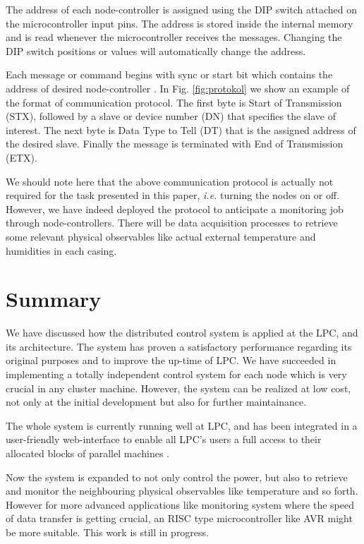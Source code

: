 \documentclass[conference,letterpaper]{IEEEtran}
\begin{document}
The address of each node-controller is assigned using the DIP switch attached on the microcontroller input pins. The address is stored inside the internal memory and is read whenever the microcontroller receives the messages. Changing the DIP switch positions or values will automatically change the address.

Each message or command begins with sync or start bit which contains the address of desired node-controller \cite{csang}. In Fig. \ref{fig:protokol} we show an example of the format of communication protocol. The first byte is Start of Transmission (STX), followed by a slave or device number (DN) that specifies the slave of interest. The next byte is Data Type to Tell (DT) that is the assigned address of the desired slave. Finally the message is terminated with End of Transmission (ETX).

We should note here that the above communication protocol is actually not required for the task presented in this paper, \textit{i.e.} turning the nodes on or off. However, we have indeed deployed the protocol to anticipate a monitoring job through node-controllers. There will be data acquisition processes to retrieve some relevant physical observables like actual external temperature and humidities in each casing.

\section{Summary}

We have discussed how the distributed control system is applied at the LPC, and its architecture. The system has proven a satisfactory performance regarding its original purposes and to improve the up-time of LPC. We have succeeded in implementing a totally independent control system for each node which is very crucial in any cluster machine. However, the system can be realized at low cost, not only at the initial development but also for further maintainance.

The whole system is currently running well at LPC, and has been integrated in a user-friendly web-interface to enable all LPC's users a full access to their allocated blocks of parallel machines \cite{lpc6}.

Now the system is expanded to not only control the power, but also to retrieve and monitor the neighbouring physical observables like temperature and so forth. However for more advanced applications like monitoring system where the speed of data transfer is getting crucial, an RISC type microcontroller like AVR might be more suitable. This work is still in progress.
\end{document}
